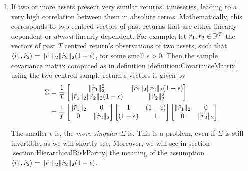 \begin{enumerate}
    	    \item If two or more assets present very similar returns' timeseries, leading to a very high correlation between them in absolute terms. Mathematically, this corresponds to two centred vectors of past returns that are either linearly dependent or \textit{almost} linearly dependent. For example, let $\Tilde{r}_1, \Tilde{r}_2 \in \mathbb{R}^T$ the vectors of past $T$ centred return's observations of two assets, such that $\langle \Tilde{r}_1, \Tilde{r}_2 \rangle = \| \Tilde{r}_1 \|_2 \| \Tilde{r}_2 \|_2 (1 - \epsilon)$, for some small $\epsilon > 0$. Then the sample covariance matrix computed as in definition \ref{definition:CovarianceMatrix} using the two centred sample return's vectors is given by
    	    \begin{align*}
    	        \Sigma &= \frac{1}{T} \begin{bmatrix}
    	            \| \Tilde{r}_1 \|_2^2 & \| \Tilde{r}_1 \|_2 \| \Tilde{r}_2 \|_2 (1 - \epsilon) \\
    	            \| \Tilde{r}_1 \|_2 \| \Tilde{r}_2 \|_2 (1 - \epsilon) & \| \Tilde{r}_2 \|_2^2
    	        \end{bmatrix} \\
    	        &= \frac{1}{T} \begin{bmatrix}
    	            \| \Tilde{r}_1 \|_2 & 0 \\
    	            0 & \| \Tilde{r}_2 \|_2
    	        \end{bmatrix} \begin{bmatrix}
    	             1 & (1 - \epsilon) \\
    	             (1 - \epsilon) & 1
    	        \end{bmatrix} \begin{bmatrix}
    	            \| \Tilde{r}_1 \|_2 & 0 \\
    	            0 & \| \Tilde{r}_2 \|_2
    	        \end{bmatrix}
    	    \end{align*}
    	    
    	    The smaller $\epsilon$ is, the \textit{more singular} $\Sigma$ is. This is a problem, even if $\Sigma$ is still invertible, as we will shortly see. Moreover, we will see in section \ref{section:HierarchicalRiskParity} the meaning of the assumption $\langle \Tilde{r}_1, \Tilde{r}_2 \rangle = \| \Tilde{r}_1 \|_2 \| \Tilde{r}_2 \|_2 (1 - \epsilon)$.
    	    

\end{enumerate}
